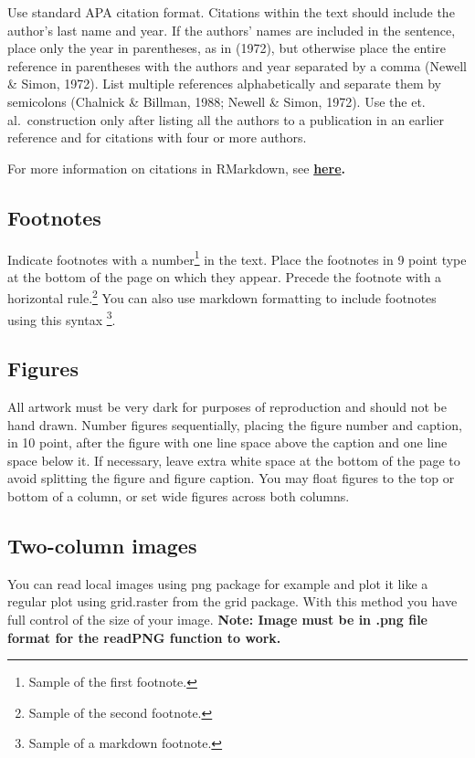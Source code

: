\documentclass[10pt, letterpaper]{article}
\begin{document}
Use standard APA citation format. Citations within the text should
include the author's last name and year. If the authors' names are
included in the sentence, place only the year in parentheses, as in
(1972), but otherwise place the entire reference in parentheses with the
authors and year separated by a comma (Newell \& Simon, 1972). List
multiple references alphabetically and separate them by semicolons
(Chalnick \& Billman, 1988; Newell \& Simon, 1972). Use the et.
al.~construction only after listing all the authors to a publication in
an earlier reference and for citations with four or more authors.

For more information on citations in RMarkdown, see
\textbf{\href{http://rmarkdown.rstudio.com/authoring_bibliographies_and_citations.html\#citations}{here}.}

\hypertarget{footnotes}{%
\subsection{Footnotes}\label{footnotes}}

Indicate footnotes with a number\footnote{Sample of the first
footnote.} in the text. Place the footnotes in 9 point type at the
bottom of the page on which they appear. Precede the footnote with a
horizontal rule.\footnote{Sample of the second footnote.} You can also
use markdown formatting to include footnotes using this syntax
\footnote{Sample of a markdown footnote.}.

\hypertarget{figures}{%
\subsection{Figures}\label{figures}}

All artwork must be very dark for purposes of reproduction and should
not be hand drawn. Number figures sequentially, placing the figure
number and caption, in 10 point, after the figure with one line space
above the caption and one line space below it. If necessary, leave extra
white space at the bottom of the page to avoid splitting the figure and
figure caption. You may float figures to the top or bottom of a column,
or set wide figures across both columns.

\hypertarget{two-column-images}{%
\subsection{Two-column images}\label{two-column-images}}

You can read local images using png package for example and plot it like
a regular plot using grid.raster from the grid package. With this method
you have full control of the size of your image. \textbf{Note: Image
must be in .png file format for the readPNG function to work.}
\end{document}
